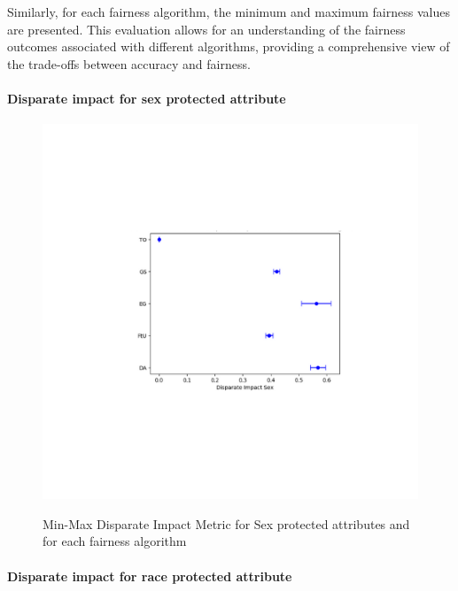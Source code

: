 Similarly, for each fairness algorithm, the minimum and maximum fairness values are presented. This evaluation allows for an understanding of the fairness outcomes associated with different algorithms, providing a comprehensive view of the trade-offs between accuracy and fairness.

\paragraph{Disparate impact for sex protected attribute}

\begin{figure}[H]
    \centering
    \includegraphics[width=1.0\textwidth, height=1.0\textwidth]{dis.png}
    \label{fig:dis}
    \caption{Min-Max Disparate Impact Metric for Sex protected attributes and for each fairness algorithm}
\end{figure}

\paragraph{Disparate impact for race protected attribute}

